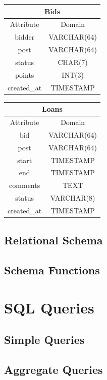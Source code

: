 \begin{center}
\begin{tabular}{|c|c|}
\multicolumn{2}{c}{Bids}\\[2mm]
\hline
Attribute & Domain\\
\hline
bidder & VARCHAR(64)\\
post & VARCHAR(64) \\
status & CHAR(7) \\
points & INT(3) \\
created\_at & TIMESTAMP \\
\hline
\end{tabular}
\end{center}

\begin{center}
\begin{tabular}{|c|c|}
\multicolumn{2}{c}{Loans}\\[2mm]
\hline
Attribute & Domain\\
\hline
bid & VARCHAR(64)\\
post & VARCHAR(64) \\
start & TIMESTAMP \\
end & TIMESTAMP \\
comments & TEXT \\
status & VARCHAR(8) \\
created\_at & TIMESTAMP \\
\hline
\end{tabular}
\end{center}


\subsection{Relational Schema}

\subsection{Schema Functions}

\newpage

\section{SQL Queries}

\subsection{Simple Queries}

\subsection{Aggregate Queries}

